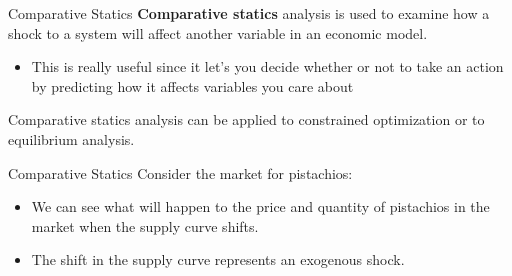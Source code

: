 \documentclass{beamer}
\begin{document}
\begin{frame}{Comparative Statics}
  \textbf{Comparative statics} analysis is used to examine how a shock to a system will affect another variable in an economic model. 
  
  \begin{itemize}
    \item This is really useful since it let's you decide whether or not to take an action by predicting how it affects variables you care about
  \end{itemize}

  Comparative statics analysis can be applied to constrained optimization or to equilibrium analysis.
\end{frame}

\begin{frame}{Comparative Statics}
  Consider the market for pistachios:

  \begin{itemize}
    \item We can see what will happen to the price and quantity of pistachios in the market when the supply curve shifts.
    \item The shift in the supply curve represents an exogenous shock.
  \end{itemize}
\end{frame}
\end{document}

